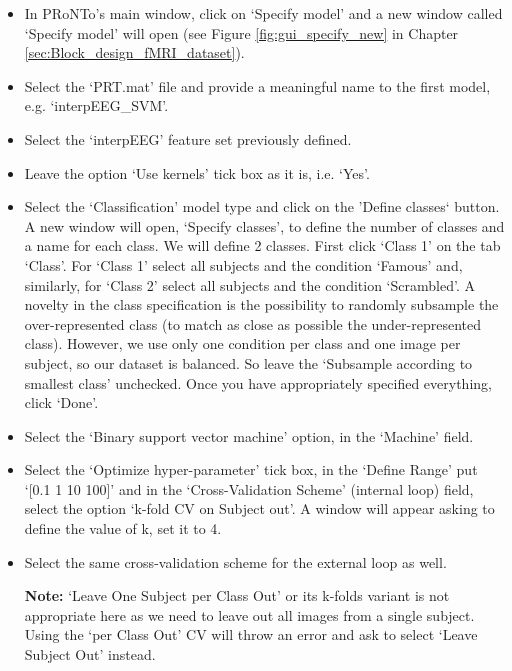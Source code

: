 \begin{itemize}
	
	\item In PRoNTo's main window, click on `Specify model' and a new window called `Specify model' will open (see Figure \ref{fig:gui_specify_new} in Chapter \ref{sec:Block_design_fMRI_dataset}).
	
	\item Select the `PRT.mat' file and provide a meaningful name to the first model, e.g. `interpEEG\_SVM'.

	\item Select the `interpEEG' feature set previously defined.

	\item Leave the option `Use kernels' tick box as it is, i.e. `Yes'.

	\item	Select the `Classification' model type and click on the 'Define classes` button. A new window will open, `Specify classes', to define the number of classes and a name for each class. We will define 2 classes. First click `Class 1' on the tab `Class'. For `Class 1' select all subjects and the condition `Famous' and, similarly, for `Class 2' select all subjects and the condition `Scrambled'. A novelty in the class specification is the possibility to randomly subsample the over-represented class (to match as close as possible the under-represented class). However, we use only one condition per class and one image per subject, so our dataset is balanced. So leave the `Subsample according to smallest class' unchecked. Once you have appropriately specified everything, click `Done'.
	
	\item Select the `Binary support vector machine' option, in the `Machine' field.
	
	\item Select the `Optimize hyper-parameter' tick box, in the `Define Range' put `[0.1 1 10 100]' and in the `Cross-Validation Scheme' (internal loop) field, select the option `k-fold CV on Subject out'. A window will appear asking to define the value of k, set it to 4.
		
	\item Select the same cross-validation scheme for the external loop as well.
	
\textbf{Note:} ‘Leave One Subject per Class Out’ or its k-folds variant is not appropriate here as we need to leave out all images from a single subject. Using the `per Class Out' CV will throw an error and ask to select ‘Leave Subject Out’ instead.
	

\end{itemize}
